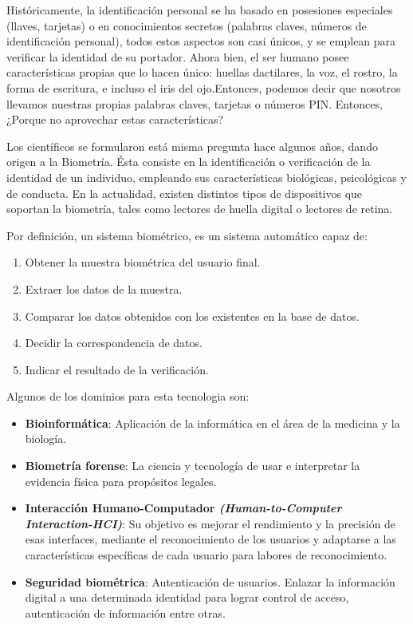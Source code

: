 Históricamente, la identificación personal se ha basado en posesiones especiales (llaves, tarjetas) o en conocimientos secretos (palabras claves, números de identificación personal), todos estos aspectos son casi únicos, y se emplean para verificar la identidad de su portador. Ahora bien, el ser humano posee características propias que lo hacen único: huellas dactilares, la voz, el rostro, la forma de escritura, e incluso el iris del ojo.Entonces, podemos decir que nosotros llevamos nuestras propias palabras claves, tarjetas o números PIN. Entonces, ¿Porque no aprovechar estas características?

Los científicos se formularon está misma pregunta hace algunos años, dando
origen a la Biometría. Ésta consiste en la identificación o verificación de la identidad de un individuo, empleando sus características biológicas, psicológicas y de conducta. En la actualidad, existen distintos tipos de dispositivos que soportan la biometría, tales como
lectores de huella digital o lectores de retina.\cite{Car08}
\newpage

Por definición, un sistema biométrico, es un sistema automático capaz de:

\begin{enumerate}

\item Obtener la muestra biométrica del usuario final.
\item Extraer los datos de la muestra.
\item Comparar los datos obtenidos con los existentes en la base de datos.
\item Decidir la correspondencia de datos.
\item Indicar el resultado de la verificación.
\end{enumerate}

Algunos de los dominios para esta tecnologia son:
\begin{itemize}
\item \textbf{Bioinformática}: Aplicación de la informática en el área de la medicina y la biología.
\item \textbf{Biometría forense}: La ciencia y tecnología de usar e interpretar la evidencia física para propósitos legales.
\item \textbf{Interacción Humano-Computador \textit{(Human-to-Computer Interaction-HCI)}}: Su objetivo es mejorar el rendimiento y la precisión de esas interfaces, mediante el reconocimiento de los usuarios y adaptarse a las características específicas de cada usuario para labores de reconocimiento.
\item \textbf{Seguridad biométrica}: Autenticación de usuarios. Enlazar la información digital a una determinada identidad para lograr control de acceso, autenticación de información entre otras.
\end{itemize}

